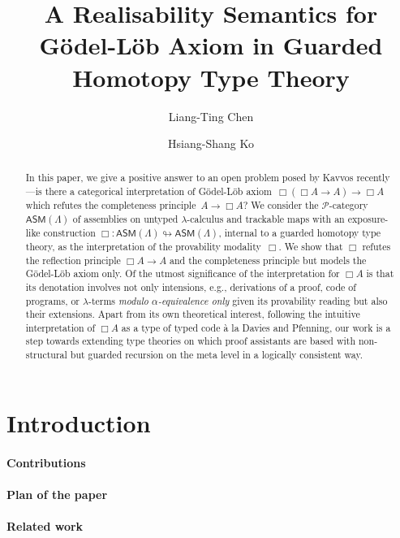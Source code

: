 \documentclass[a4paper,UKenglish,numberwithinsect,cleveref,thm-restate]{lipics-v2021}
\title{A Realisability Semantics for Gödel-Löb Axiom in Guarded Homotopy Type Theory}
\author{Liang-Ting Chen}%
  {Institute of Information Science, Academia Sinica, Taiwan~\url{https://l-tchen.github.io}}%
  {liang.ting.chen.tw@gmail.com}%
  {https://orcid.org/0000-0002-3250-1331}{}
\author{Hsiang-Shang Ko}%
  {Institute of Information Science, Academia Sinica, Taiwan~\url{https://josh-hs-ko.github.io}}%
  {joshko@iis.sinica.edu.tw}%
  {https://orcid.org/0000-0002-2439-1048}{}
\newcommand{\PP}{\mathscr{P}}
\newcommand{\ASM}{\mathsf{ASM}}
\theoremstyle{plain}
\begin{document}
\maketitle

\begin{abstract}
  In this paper, we give a positive answer to an open problem posed by Kavvos recently---is there a categorical interpretation of Gödel-Löb axiom~$\Box (\Box A \to A) \to \Box A$ which refutes the completeness principle~$A \to \Box A$?
  We consider the $\PP$-category $\ASM(\Lambda)$ of assemblies on untyped $\lambda$-calculus and trackable maps with an exposure-like construction $\Box\colon \ASM(\Lambda) \looparrowright \ASM(\Lambda)$, internal to a guarded homotopy type theory, as the interpretation of the provability modality~$\Box$.
  We show that $\Box$ refutes the reflection principle $\Box A \to A$ and the completeness principle but models the Gödel-Löb axiom only.
  Of the utmost significance of the interpretation for $\Box A$ is that its denotation involves not only intensions, e.g., derivations of a proof, code of programs, or $\lambda$-terms \emph{modulo $\alpha$-equivalence only} given its provability reading but also their extensions. 
  Apart from its own theoretical interest, following the intuitive interpretation of $\Box A$ as a type of typed code \`a la Davies and Pfenning, our work is a step towards extending type theories on which proof assistants are based with non-structural but guarded recursion on the meta level in a logically consistent way.
\end{abstract}

\section{Introduction}\label{sec:intro}
\cite{Litak2014}
\cite{Davies2001b}

\paragraph*{Contributions}

\paragraph*{Plan of the paper}

\paragraph*{Related work}
\cite{Visser2019,Beklemishev2006}
\cite{Kavvos2017,Kavvos2020}
\cite{Shamkanov2014,Shamkanov2016a}
\end{document}
